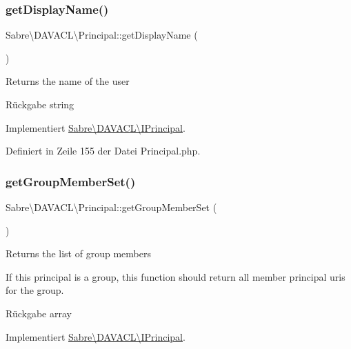 \subsubsection{\texorpdfstring{get\+Display\+Name()}{getDisplayName()}}
{\footnotesize\ttfamily Sabre\textbackslash{}\+D\+A\+V\+A\+C\+L\textbackslash{}\+Principal\+::get\+Display\+Name (\begin{DoxyParamCaption}{ }\end{DoxyParamCaption})}

Returns the name of the user

\begin{DoxyReturn}{Rückgabe}
string 
\end{DoxyReturn}


Implementiert \mbox{\hyperlink{interface_sabre_1_1_d_a_v_a_c_l_1_1_i_principal_aff7f7f00c81458d5d9e20e28f4d32461}{Sabre\textbackslash{}\+D\+A\+V\+A\+C\+L\textbackslash{}\+I\+Principal}}.



Definiert in Zeile 155 der Datei Principal.\+php.

\mbox{\label{class_sabre_1_1_d_a_v_a_c_l_1_1_principal_afaa4afcbbaa47b295dd84e9e4e71ca25}} 
\subsubsection{\texorpdfstring{get\+Group\+Member\+Set()}{getGroupMemberSet()}}
{\footnotesize\ttfamily Sabre\textbackslash{}\+D\+A\+V\+A\+C\+L\textbackslash{}\+Principal\+::get\+Group\+Member\+Set (\begin{DoxyParamCaption}{ }\end{DoxyParamCaption})}

Returns the list of group members

If this principal is a group, this function should return all member principal uri\textquotesingle{}s for the group.

\begin{DoxyReturn}{Rückgabe}
array 
\end{DoxyReturn}


Implementiert \mbox{\hyperlink{interface_sabre_1_1_d_a_v_a_c_l_1_1_i_principal_ad9f9e4ed25ec5ec9325288b076cdd09f}{Sabre\textbackslash{}\+D\+A\+V\+A\+C\+L\textbackslash{}\+I\+Principal}}.



